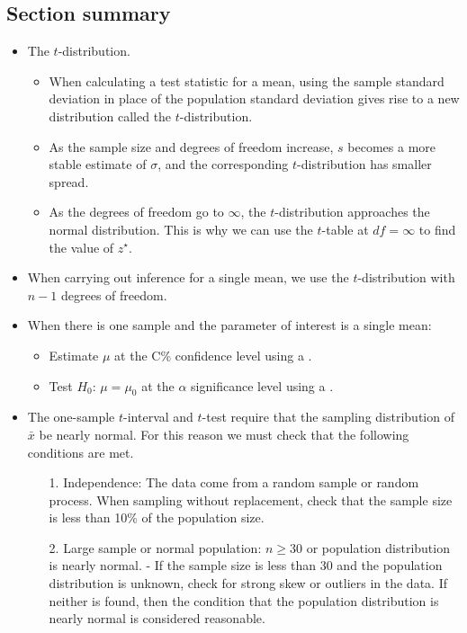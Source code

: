 \subsection*{Section summary}
\begin{itemize} 
\item The $t$-distribution.\vspace{-1mm}
\begin{itemize}
\setlength{\itemsep}{0mm}
\item When calculating a test statistic for a mean, using the sample standard deviation in place of the population standard deviation gives rise to a new distribution called the $t$-distribution.  

\item As the sample size and degrees of freedom increase, $s$ becomes a more stable estimate of $\sigma$, and the corresponding $t$-distribution has smaller spread.  

\item As the degrees of freedom go to $\infty$, the $t$-distribution approaches the normal distribution.  This is why we can use the $t$-table at $df=\infty$ to find the value of $z^{\star}$.
\end{itemize}

\item When carrying out inference for a single mean, we use the $t$-distribution with $n-1$ degrees of freedom.

\item When there is one sample and the parameter of interest is a single mean:
\begin{itemize}
\item Estimate $\mu$ at the C\% confidence level using a .
\item Test $H_0$: $\mu=\mu_0$ at the $\alpha$ significance level using a . 
\end{itemize}

\item The one-sample $t$-interval and $t$-test require that the sampling distribution of $\bar{x}$ be nearly normal.  For this reason we must check that the following conditions are met.
\begin{itemize}
\item[1.] Independence:  The data come from a random sample or random process.  When sampling without replacement, check that the sample size is less than 10\% of the population size.
\item[2.]  Large sample or normal population: $n\ge 30$ or population distribution is nearly normal. 
- If the sample size is less than 30 and the population distribution is unknown, check for strong skew or outliers in the data.  If neither is found, then the condition that the population distribution is nearly normal is considered reasonable.
\end{itemize}


\end{itemize}
